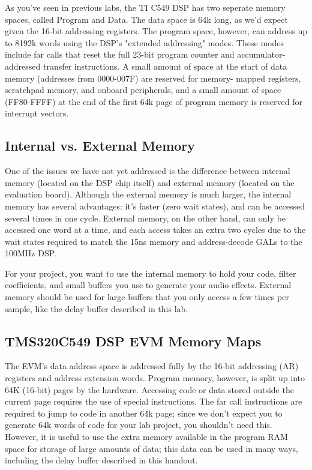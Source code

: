
%
%
%
%
%

As you've seen in previous labs, the TI C549 DSP has two seperate
memory spaces, called Program and Data. The data space is 64k long,
as we'd expect given the 16-bit addressing registers. The program
space, however, can address up to 8192k words using the DSP's
"extended addressing" modes. These modes include far calls that
reset the full 23-bit program counter and accumulator-addressed
transfer instructions. A small amount of space at the start of
data memory (addresses from 0000-007F) are reserved for memory-
mapped registers, scratchpad memory, and onboard peripherals, and a
small amount of space (FF80-FFFF) at the end of the first 64k page of
program memory is reserved for interrupt vectors.

\subsection{Internal vs. External Memory}

One of the issues we have not yet addressed is the difference between
internal
memory (located on the DSP chip itself) and external memory (located on the
evaluation board). Although the external memory is much larger, the internal
memory has several advantages: it's faster (zero wait states), and can be
accessed several times in one cycle. External memory, on the other hand,
can only be accessed one word at a time, and each access takes an extra
two cycles due to the wait states required to match the 15ns memory and
address-decode GALs to the 100MHz DSP.

For your project, you want to use the internal memory to hold your code,
filter coefficients, and small buffers you use to generate your audio
effects. External memory should be used for large buffers that you
only access a few times per sample, like the delay buffer described
in this lab.

\subsection{TMS320C549 DSP EVM Memory Maps}

The EVM's data address space is addressed fully by the 16-bit addressing
(AR) registers and address extension words. Program memory,
however, is split up into 64K (16-bit) pages by the hardware. Accessing
code or data stored outside the current page requires the use of special
instructions. The far call instructions are required to jump to code in
another 64k page; since we don't expect you to generate 64k words of
code for your lab project, you shouldn't need this. However, it is useful
to use the extra memory available in the program RAM space for storage
of large amounts of data; this data can be used in many ways, including
the delay buffer described in this handout.

